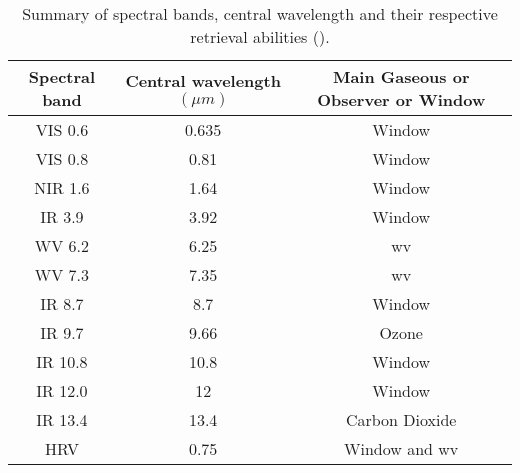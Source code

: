 \begin{table}[ht]
    \centering
    \setlength\extrarowheight{-7pt}
    \begin{tabular}{c|c|c}
        Spectral band & Central wavelength $\left( \mu m  \right)$ & Main Gaseous or
        Observer or Window \\ \hline
        VIS 0.6 & 0.635 & Window    \\ %
        VIS 0.8 & 0.81  & Window     \\ %
        NIR 1.6 & 1.64  & Window    \\ %
        IR 3.9 & 3.92  & Window     \\ %
        WV 6.2 & 6.25 & \acrlong{wv}  \\
        WV 7.3 & 7.35 & \acrlong{wv}  \\ 
        IR 8.7 & 8.7 &  Window       \\ %
        IR 9.7 & 9.66 & Ozone        \\
        IR 10.8 & 10.8 & Window  \\ %
        IR 12.0 & 12 & Window \\ %
        IR 13.4 & 13.4 & Carbon Dioxide  \\
        HRV & 0.75 & Window and \acrlong{wv}
    \end{tabular}
    \caption{Summary of spectral bands, central wavelength and their respective retrieval abilities (\cite{Schmetz_meteosat_intro}).}
    \label{tab:msg_spectral_bands}
\end{table}